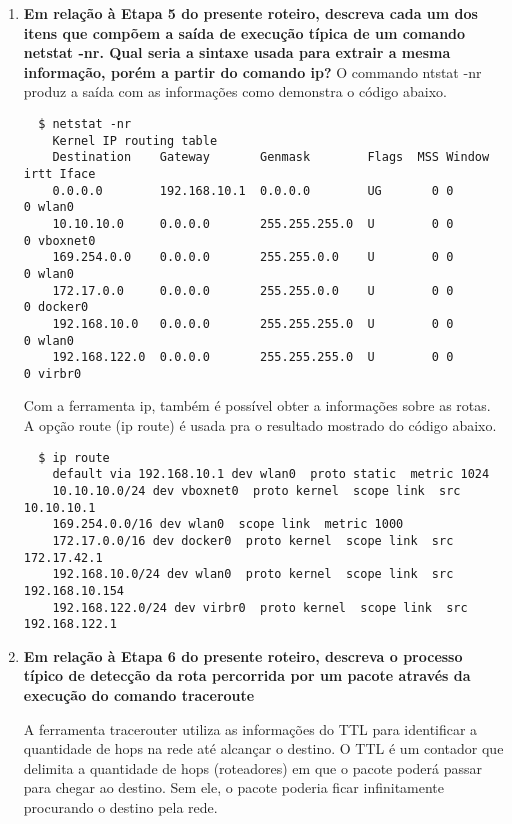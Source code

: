 \begin{enumerate}
  \item \textbf{Em relação à Etapa 5 do presente roteiro, descreva cada um dos itens que compõem a saída
    de execução típica de um comando netstat -nr. Qual seria a sintaxe usada para extrair a
    mesma informação, porém a partir do comando ip?}
\newpage
  O commando ntstat -nr produz a saída com as informações como demonstra o código abaixo.
  
  \lstset{style=basic}
  \begin{lstlisting}
  $ netstat -nr
    Kernel IP routing table
    Destination    Gateway       Genmask        Flags  MSS Window  irtt Iface
    0.0.0.0        192.168.10.1  0.0.0.0        UG       0 0          0 wlan0
    10.10.10.0     0.0.0.0       255.255.255.0  U        0 0          0 vboxnet0
    169.254.0.0    0.0.0.0       255.255.0.0    U        0 0          0 wlan0
    172.17.0.0     0.0.0.0       255.255.0.0    U        0 0          0 docker0
    192.168.10.0   0.0.0.0       255.255.255.0  U        0 0          0 wlan0
    192.168.122.0  0.0.0.0       255.255.255.0  U        0 0          0 virbr0
  \end{lstlisting}

  Com a ferramenta ip, também é possível obter a informações sobre as rotas. A opção route (ip route)
  é usada pra o resultado mostrado do código abaixo.

  \lstset{style=basic}
  \begin{lstlisting}
  $ ip route
    default via 192.168.10.1 dev wlan0  proto static  metric 1024 
    10.10.10.0/24 dev vboxnet0  proto kernel  scope link  src 10.10.10.1 
    169.254.0.0/16 dev wlan0  scope link  metric 1000 
    172.17.0.0/16 dev docker0  proto kernel  scope link  src 172.17.42.1 
    192.168.10.0/24 dev wlan0  proto kernel  scope link  src 192.168.10.154 
    192.168.122.0/24 dev virbr0  proto kernel  scope link  src 192.168.122.1 
  \end{lstlisting}

  \item \textbf{Em relação à Etapa 6 do presente roteiro, descreva o processo típico de detecção da rota
    percorrida por um pacote através da execução do comando traceroute}

    A ferramenta tracerouter utiliza as informações do TTL para identificar a quantidade de hops
    na rede até alcançar o destino. O TTL é um contador que delimita a quantidade de hops (roteadores)
    em que o pacote poderá passar para chegar ao destino. Sem ele, o pacote poderia ficar infinitamente
    procurando o destino pela rede.


\end{enumerate}
